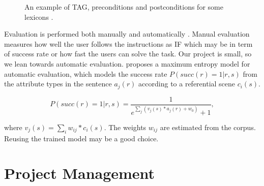 \documentclass[11pt]{article} %
\begin{document}
\begin{figure}[hbt!]
\centering
{}
\qquad
{}
\caption{An example of TAG, preconditions and postconditions for some lexicons \cite{garoufi2014generation}. \label{overflow}}
\label{fig:exampleTAG}
\end{figure}

Evaluation is performed both manually and automatically \cite{garoufi2014generation}.
Manual evaluation measures how well the user follows the instructions
as IF which may be in term of success rate or how fast the users can solve the task.
Our project is small, so we lean towards automatic evaluation.
\cite{garoufi2014generation} proposes a maximum entropy model for automatic evaluation,
which models the success rate $P(succ(r) = 1|r,s)$ from the attribute
types in the sentence $a_j(r)$ according to a referential scene $c_i(s)$. 

\begin{equation} \label{auto_eqn}
P(succ(r) = 1| r, s) =\frac{1}{e^{\sum_j (v_j(s)*a_j(r) + w_0)} + 1} ,
\end{equation}

where $v_j(s) = \sum_i w_{ij} * c_i(s)$.
The weights $w_{ij}$ are estimated from the corpus.
Reusing the trained model may be a good choice.

\section{Project Management}
\end{document}
